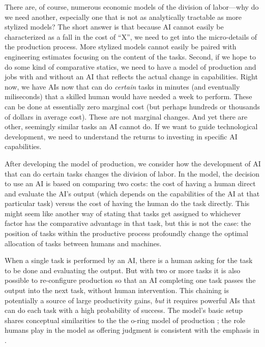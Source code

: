 \documentclass{article}
\begin{document}
There are, of course, numerous economic models of the division of labor\citep{becker1992division, deming2017growing}---why do we need another, especially one that is not as analytically tractable as more stylized models?
The short answer is that because AI cannot easily be characterized as a fall in the cost of ``X'', we need to get into the micro-details of the production process. 
More stylized models cannot easily be paired with engineering estimates focusing on the content of the tasks. 
Second, if we hope to do some kind of comparative statics, we need to have a model of production and jobs with and without an AI that reflects the actual change in capabilities.
Right now, we have AIs now that can do \emph{certain} tasks in minutes (and eventually miliseconds) that a skilled human would have needed a week to perform. 
These can be done at essentially zero marginal cost (but perhaps hundreds or thousands of dollars in average cost). 
These are not marginal changes. 
And yet there are other, seemingly similar tasks an AI cannot do.
If we want to guide technological development, we need to understand the returns to investing in specific AI capabilities.

After developing the model of production, we consider how the development of AI that can do certain tasks changes the division of labor.
In the model, the decision to use an AI is based on comparing two costs: the cost of having a human direct and evaluate the AI's output (which depends on the capabilities of the AI at that particular task) versus the cost of having the human do the task directly.
This might seem like another way of stating that tasks get assigned to whichever factor has the comparative advantage in that task, but this is not the case: the position of tasks within the productive process profoundly change the optimal allocation of tasks between humans and machines.

When a single task is performed by an AI, there is a human asking for the task to be done and evaluating the output.
But with two or more tasks it is also possible to re-configure production so that an AI completing one task passes the output into the next task, without human intervention.
This chaining is potentially a source of large productivity gains, \emph{but} it requires powerful AIs that can do each task with a high probability of success. 
The model's basic setup shares conceptual similarities to the the o-ring model of production \citep{kremer1993}; the role humans play in the model as offering judgment is consistent with the emphasis in \cite{agrawal2019exploring}.
\end{document}
